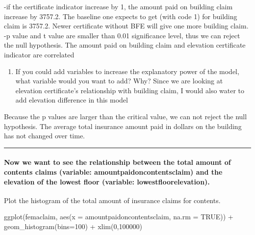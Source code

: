 \documentclass[
]{article}
\newenvironment{Shaded}{\begin{snugshade}}{\end{snugshade}}
\newcommand{\AttributeTok}[1]{\textcolor[rgb]{0.77,0.63,0.00}{#1}}
\newcommand{\ConstantTok}[1]{\textcolor[rgb]{0.00,0.00,0.00}{#1}}
\newcommand{\DecValTok}[1]{\textcolor[rgb]{0.00,0.00,0.81}{#1}}
\newcommand{\FunctionTok}[1]{\textcolor[rgb]{0.00,0.00,0.00}{#1}}
\newcommand{\NormalTok}[1]{#1}
\newcommand{\SpecialCharTok}[1]{\textcolor[rgb]{0.00,0.00,0.00}{#1}}
\providecommand{\tightlist}{%
  \setlength{\itemsep}{0pt}\setlength{\parskip}{0pt}}
\begin{document}
-if the certificate indicator increase by 1, the amount paid on building
claim increase by 3757.2. The baseline one expects to get (with code 1)
for building claim is 3757.2. Newer certificate without BFE will give
one more building claim. -p value and t value are smaller than 0.01
significance level, thus we can reject the null hypothesis. The amount
paid on building claim and elevation certificate indicator are
correlated

\begin{enumerate}
\def\labelenumi{\arabic{enumi}.}
\setcounter{enumi}{6}
\tightlist
\item
  If you could add variables to increase the explanatory power of the
  model, what variable would you want to add? Why? Since we are looking
  at elevation certificate's relationship with building claim, I would
  also water to add elevation difference in this model
\end{enumerate}

Because the p values are larger than the critical value, we can not
reject the null hypothesis. The average total insurance amount paid in
dollars on the building has not changed over time.

\begin{center}\rule{0.5\linewidth}{0.5pt}\end{center}

\hypertarget{now-we-want-to-see-the-relationship-between-the-total-amount-of-contents-claims-variable-amountpaidoncontentsclaim-and-the-elevation-of-the-lowest-floor-variable-lowestfloorelevation.}{%
\paragraph{Now we want to see the relationship between the total amount
of contents claims (variable: amountpaidoncontentsclaim) and the
elevation of the lowest floor (variable:
lowestfloorelevation).}\label{now-we-want-to-see-the-relationship-between-the-total-amount-of-contents-claims-variable-amountpaidoncontentsclaim-and-the-elevation-of-the-lowest-floor-variable-lowestfloorelevation.}}

Plot the histogram of the total amount of insurance claims for contents.

\begin{Shaded}
\begin{Highlighting}[]
\FunctionTok{ggplot}\NormalTok{(femaclaim, }\FunctionTok{aes}\NormalTok{(}\AttributeTok{x =}\NormalTok{ amountpaidoncontentsclaim, }\AttributeTok{na.rm =} \ConstantTok{TRUE}\NormalTok{)) }\SpecialCharTok{+} \FunctionTok{geom\_histogram}\NormalTok{(}\AttributeTok{bins=}\DecValTok{100}\NormalTok{) }\SpecialCharTok{+} \FunctionTok{xlim}\NormalTok{(}\DecValTok{0}\NormalTok{,}\DecValTok{100000}\NormalTok{)}
\end{Highlighting}
\end{Shaded}
\end{document}
